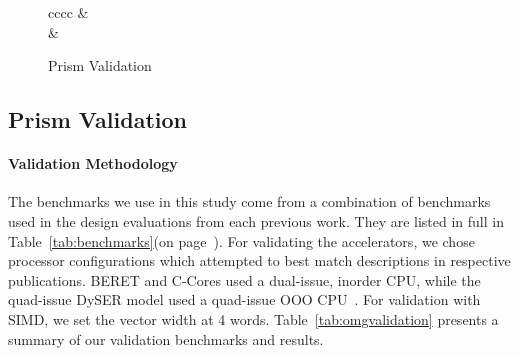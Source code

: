 \begin{figure}
\begin{adjustwidth}{-0.75in}{-0.75in}
\begin{center}
\begin{tabular}{cccc}
     &
     \\

     &
     \\
    \midrule

\end{tabular}
\end{center}
\vspace{-0.1in}
\caption{Prism Validation}
\label{fig:validation}
\end{adjustwidth}
\end{figure}



\subsection{Prism Validation}

\paragraph{Validation Methodology}  The benchmarks we use in this study come
from a combination of benchmarks used in the design evaluations from each
previous work.  They are listed in full in Table~\ref{tab:benchmarks}(on
page~\pageref{tab:benchmarks}).  For validating the accelerators, we chose
processor configurations which attempted to best match descriptions in
respective publications. BERET and C-Cores used a dual-issue, inorder CPU,
while the quad-issue DySER model used a quad-issue OOO 
CPU~\cite{ieeemicro12:dyser,Gupta:2011:BER:2155620.2155623,Venkatesh:2010:CCR:1736020.1736044}.  For validation with SIMD, we set the vector width at 4 words.  
Table~\ref{tab:omgvalidation} presents a summary of our validation benchmarks
and results.

